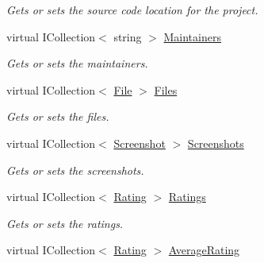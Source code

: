 \begin{DoxyCompactItemize}
\begin{DoxyCompactList}\small\item\em Gets or sets the source code location for the project. \end{DoxyCompactList}\item 
virtual I\+Collection$<$ string $>$ \hyperlink{class_open_1_1_g_i_1_1hypermart_1_1_models_1_1_product_af39b6e12bee2265db7bbca5ecbeb116c}{Maintainers}
\begin{DoxyCompactList}\small\item\em Gets or sets the maintainers. \end{DoxyCompactList}\item 
virtual I\+Collection$<$ \hyperlink{class_open_1_1_g_i_1_1hypermart_1_1_models_1_1_file}{File} $>$ \hyperlink{class_open_1_1_g_i_1_1hypermart_1_1_models_1_1_product_a8632e80d5f05c8818c289b3924137c13}{Files}
\begin{DoxyCompactList}\small\item\em Gets or sets the files. \end{DoxyCompactList}\item 
virtual I\+Collection$<$ \hyperlink{class_open_1_1_g_i_1_1hypermart_1_1_models_1_1_screenshot}{Screenshot} $>$ \hyperlink{class_open_1_1_g_i_1_1hypermart_1_1_models_1_1_product_a5fae1aafb8f9a3af27ce369d5d053df1}{Screenshots}
\begin{DoxyCompactList}\small\item\em Gets or sets the screenshots. \end{DoxyCompactList}\item 
virtual I\+Collection$<$ \hyperlink{class_open_1_1_g_i_1_1hypermart_1_1_models_1_1_rating}{Rating} $>$ \hyperlink{class_open_1_1_g_i_1_1hypermart_1_1_models_1_1_product_a7e60500876b53ff5597ccae7f88e1d5e}{Ratings}
\begin{DoxyCompactList}\small\item\em Gets or sets the ratings. \end{DoxyCompactList}\item 
virtual I\+Collection$<$ \hyperlink{class_open_1_1_g_i_1_1hypermart_1_1_models_1_1_rating}{Rating} $>$ \hyperlink{class_open_1_1_g_i_1_1hypermart_1_1_models_1_1_product_aa13c2560a38bf25cc01435cef5e2ba7e}{Average\+Rating}

\end{DoxyCompactItemize}
